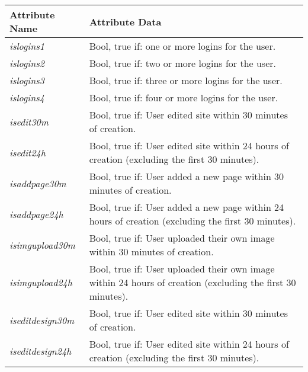 \begin{table}[H]
    \centering
    \begin{tabularx}{\textwidth}{l|X}
        \textbf{Attribute Name} & \textbf{Attribute Data}                                                                                                     \\ \hline
        \textit{islogins1}                       & Bool, true if: one or more logins for the user.                                                            \\
        \textit{islogins2}                       & Bool, true if: two or more logins for the user.                                                            \\
        \textit{islogins3}                       & Bool, true if: three or more logins for the user.                                                          \\
        \textit{islogins4}                       & Bool, true if: four or more logins for the user.                                                           \\
        \textit{isedit30m}                       & Bool, true if: User edited site within 30 minutes of creation.                                             \\
        \textit{isedit24h}                       & Bool, true if: User edited site within 24 hours of creation (excluding the first 30 minutes).              \\
        \textit{isaddpage30m}                    & Bool, true if: User added a new page within 30 minutes of creation.                                        \\
        \textit{isaddpage24h}                    & Bool, true if: User added a new page within 24 hours of creation (excluding the first 30 minutes).         \\
        \textit{isimgupload30m}                  & Bool, true if: User uploaded their own image within 30 minutes of creation.                                \\
        \textit{isimgupload24h}                  & Bool, true if: User uploaded their own image within 24 hours of creation (excluding the first 30 minutes). \\
        \textit{iseditdesign30m}                 & Bool, true if: User edited site within 30 minutes of creation.                                             \\
        \textit{iseditdesign24h}                 & Bool, true if: User edited site within 24 hours of creation (excluding the first 30 minutes).              \\

\end{tabularx}
\end{table}
